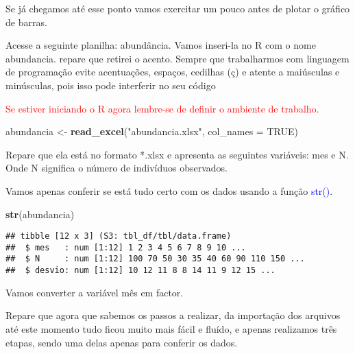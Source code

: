 \documentclass[titlepage, oneside, openany, a4paper]{book}
\newenvironment{Shaded}{\begin{snugshade}}{\end{snugshade}}
\newcommand{\DataTypeTok}[1]{\textcolor[rgb]{0.13,0.29,0.53}{#1}}
\newcommand{\KeywordTok}[1]{\textcolor[rgb]{0.13,0.29,0.53}{\textbf{#1}}}
\newcommand{\NormalTok}[1]{#1}
\newcommand{\OperatorTok}[1]{\textcolor[rgb]{0.81,0.36,0.00}{\textbf{#1}}}
\newcommand{\OtherTok}[1]{\textcolor[rgb]{0.56,0.35,0.01}{#1}}
\newcommand{\StringTok}[1]{\textcolor[rgb]{0.31,0.60,0.02}{#1}}
\begin{document}
Se já chegamos até esse ponto vamos exercitar um pouco antes de plotar o gráfico de barras.

Acesse a seguinte planilha: abundância. Vamos inseri-la no R com o nome abundancia. repare que retirei o acento. Sempre que trabalharmos com linguagem de programação evite acentuações, espaços, cedilhas (ç) e atente a maiúsculas e minúsculas, pois isso pode interferir no seu código

\textcolor{red}{Se estiver iniciando o R agora lembre-se de definir o ambiente de trabalho.}

\begin{Shaded}
\begin{Highlighting}[]
\NormalTok{abundancia <-}\StringTok{ }\KeywordTok{read_excel}\NormalTok{(}\StringTok{"abundancia.xlsx"}\NormalTok{, }\DataTypeTok{col_names =} \OtherTok{TRUE}\NormalTok{)}
\end{Highlighting}
\end{Shaded}

Repare que ela está no formato *.xlsx e apresenta as seguintes variáveis: mes e N. Onde N significa o número de indivíduos observados.

Vamos apenas conferir se está tudo certo com os dados usando a função \textcolor{blue}{str()}.

\begin{Shaded}
\begin{Highlighting}[]
\KeywordTok{str}\NormalTok{(abundancia)}
\end{Highlighting}
\end{Shaded}

\begin{verbatim}
## tibble [12 x 3] (S3: tbl_df/tbl/data.frame)
##  $ mes   : num [1:12] 1 2 3 4 5 6 7 8 9 10 ...
##  $ N     : num [1:12] 100 70 50 30 35 40 60 90 110 150 ...
##  $ desvio: num [1:12] 10 12 11 8 8 14 11 9 12 15 ...
\end{verbatim}

Vamos converter a variável mês em factor.

\begin{Shaded}
\end{Shaded}

Repare que agora que sabemos os passos a realizar, da importação dos arquivos até este momento tudo ficou muito mais fácil e fluído, e apenas realizamos três etapas, sendo uma delas apenas para conferir os dados.
\end{document}
